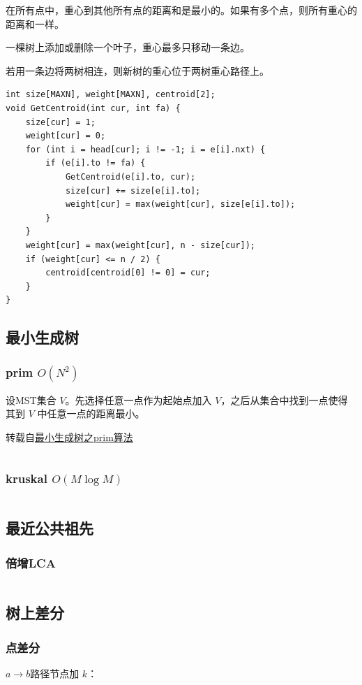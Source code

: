 \documentclass[a4paper,11pt]{article}
\begin{document}
在所有点中，重心到其他所有点的距离和是最小的。如果有多个点，则所有重心的距离和一样。

一棵树上添加或删除一个叶子，重心最多只移动一条边。

若用一条边将两树相连，则新树的重心位于两树重心路径上。

\begin{verbatim}
int size[MAXN], weight[MAXN], centroid[2];
void GetCentroid(int cur, int fa) {
    size[cur] = 1;
    weight[cur] = 0;
    for (int i = head[cur]; i != -1; i = e[i].nxt) {
        if (e[i].to != fa) { 
            GetCentroid(e[i].to, cur);
            size[cur] += size[e[i].to];
            weight[cur] = max(weight[cur], size[e[i].to]);
        }
    }
    weight[cur] = max(weight[cur], n - size[cur]);
    if (weight[cur] <= n / 2) { 
        centroid[centroid[0] != 0] = cur;
    }
}
\end{verbatim}
\subsection{最小生成树}
\subsubsection{prim \texorpdfstring{\(O(N^2)\)}{O(N2)}}
设MST集合 \(V\)。先选择任意一点作为起始点加入
\(V\)，之后从集合中找到一点使得其到 \(V\) 中任意一点的距离最小。

转载自\href{https://www.cnblogs.com/fzl194/p/8722989.html}{最小生成树之prim算法}
\inputminted[linenos]{c++}{graph/prim.cpp}
\subsubsection{kruskal \texorpdfstring{\(O(M\log M)\)}{O(M log M)}}
\inputminted[linenos]{c++}{graph/kruskal.cpp}
\subsection{最近公共祖先}
\subsubsection{倍增LCA}
\inputminted[linenos]{c++}{graph/beizenglca.cpp}
\subsection{树上差分}
\subsubsection{点差分}
\(a\to b\)路径节点加 \(k\)：
\end{document}
